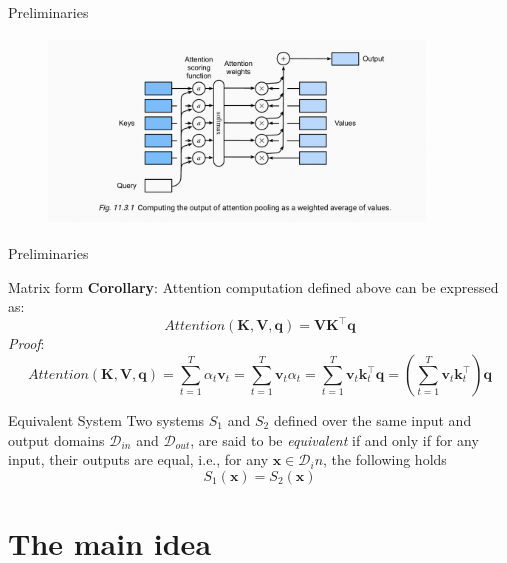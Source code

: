 \documentclass{beamer}
\begin{document}
\begin{frame}{Preliminaries}
    \begin{figure}[h]
    \centering
    \includegraphics[width=10cm, height=5cm]{attention_model.png}
\end{figure}
\end{frame}

\begin{frame}{Preliminaries}
    \begin{block}{Matrix form}
        \textbf{Corollary}: Attention computation defined above can be expressed as:
        \begin{equation}\label{mf_attn}
            Attention(\mathbf{K}, \mathbf{V}, \mathbf{q}) = \mathbf{V}\mathbf{K}^\top\mathbf{q}
        \end{equation}
        \textit{Proof}:
        \begin{equation*}
            Attention(\mathbf{K}, \mathbf{V}, \mathbf{q}) = \sum_{t=1}^T\alpha_t\mathbf{v}_t = \sum_{t=1}^T\mathbf{v}_t\alpha_t = \sum_{t=1}^T\mathbf{v}_t\mathbf{k}^\top_t \mathbf{q} = \left(\sum_{t=1}^T\mathbf{v}_t\mathbf{k}^\top_t\right) \mathbf{q}
        \end{equation*}
    \end{block}
    \begin{block}{Equivalent System}
         Two systems $S_1$ and $S_2$ defined over the same input and output domains $\mathcal{D}_{in}$ and $\mathcal{D}_{out}$, are said to be \textit{equivalent} if and only if for any input, their outputs are equal, i.e., for any $\mathbf{x} \in \mathcal{D}_in$, the following holds
         \begin{equation}\label{def_eqsys}
             S_1(\mathbf{x}) = S_2(\mathbf{x})
         \end{equation}
    \end{block}
\end{frame}

\section{The main idea}
\end{document}
